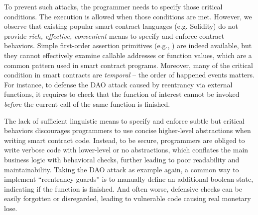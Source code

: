 

To prevent such attacks, the programmer needs to specify those critical
conditions. The execution is allowed when those conditions are met.
However, we observe that existing popular smart contract languages (e.g.
Solidity) do not provide \emph{rich, effective, convenient} means to specify
and enforce contract behaviors.
Simple first-order assertion primitives (e.g., ) are indeed available,
but they cannot effectively examine callable addresses or function values, which
are a common pattern used in smart contract programs.
Moreover, many of the critical condition in smart contracts are \emph{temporal}
-- the order of happened events matters.
For instance, to defense the DAO attack caused by reentrancy via
external functions, it requires to check that the function of interest cannot
be invoked \emph{before} the current call of the same function is finished.


The lack of sufficient linguistic means to specify and enforce subtle but
critical behaviors discourages programmers to use concise higher-level
abstractions when writing smart contract code.
Instead, to be secure, programmers are obliged to write verbose code with
lower-level or no abstractions, which conflates the main business logic with
behavioral checks, further leading to poor readability and maintainability.
Taking the DAO attack as example again, a common way to implement ``reentrancy
guards'' is to manually define an additional boolean state, indicating
if the function is finished.
And often worse, defensive checks can be easily forgotten or disregarded,
leading to vulnerable code causing real monetary lose.


